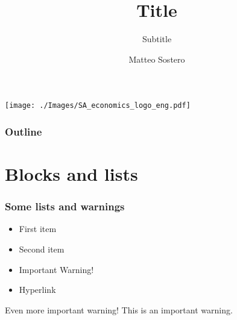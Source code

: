 \documentclass{beamer}                %
\author{Matteo Sostero}
\institute{Sant'Anna School of Advanced Studies, Pisa}
\title{Title}
\subtitle{Subtitle}
\begin{document}
\begin{frame}
\texttt{[image: ./Images/SA\_economics\_logo\_eng.pdf]}
\maketitle
\end{frame}


\begin{frame}
\frametitle{Outline}
\tableofcontents
\end{frame}



\section{Blocks and lists}

\begin{frame}
\frametitle{Some lists and warnings}
\begin{itemize}[<+->]
\item First item
\item Second item
\item \alert{Important Warning!}
\item Hyperlink  
\end{itemize}
\pause[\thebeamerpauses]
\begin{alertblock}{Even more important warning!}
This is an important warning.
\end{alertblock}
\end{frame}
\end{document}
